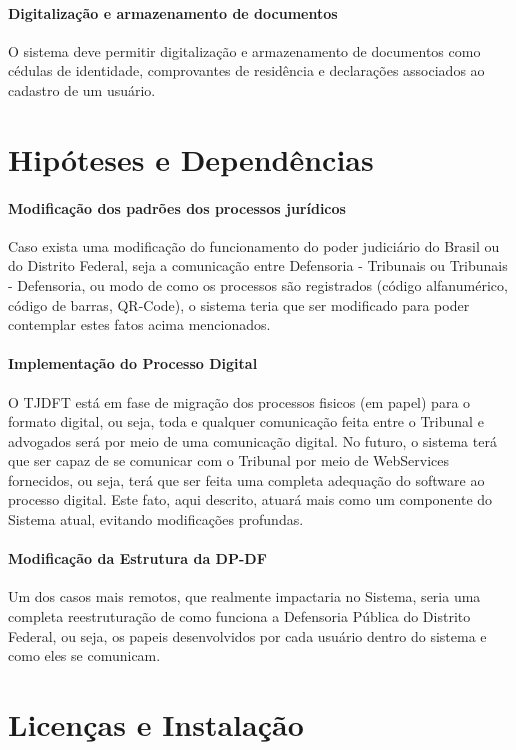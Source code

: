 \documentclass[12pt,a4paper]{report}
\begin{document}
\paragraph{Digitalização e armazenamento de documentos} O sistema deve permitir digitalização e armazenamento de documentos como cédulas de identidade, comprovantes de residência e declarações associados ao cadastro de um usuário.


\section{Hipóteses e Dependências}

\paragraph{Modificação dos padrões dos processos jurídicos} Caso exista uma modificação do funcionamento do poder judiciário do Brasil ou do Distrito Federal, seja a comunicação entre Defensoria - Tribunais ou Tribunais - Defensoria, ou modo de como os processos são registrados (código alfanumérico, código de barras, QR-Code), o sistema teria que ser modificado para poder contemplar estes fatos acima mencionados.

\paragraph{Implementação do Processo Digital} O TJDFT está em fase de migração dos processos fisicos (em papel) para o formato digital, ou seja, toda e qualquer comunicação feita entre o Tribunal e advogados será por meio de uma comunicação digital. No futuro, o sistema terá que ser capaz de se comunicar com o Tribunal por meio de WebServices fornecidos, ou seja, terá que ser feita uma completa adequação do software ao processo digital. Este fato, aqui descrito, atuará mais como um componente do Sistema atual, evitando modificações profundas.

\paragraph{Modificação da Estrutura da DP-DF} Um dos casos mais remotos, que realmente impactaria no Sistema, seria uma completa reestruturação de como funciona a Defensoria Pública do Distrito Federal, ou seja, os papeis desenvolvidos por cada usuário dentro do sistema e como eles se comunicam.

\section{Licenças e Instalação}
\end{document}
